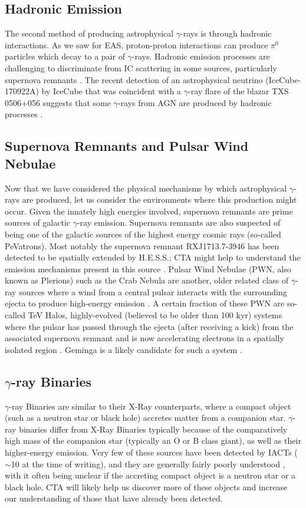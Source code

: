 \subsection{Hadronic Emission}
The second method of producing astrophysical $\gamma$-rays is through hadronic interactions. As we saw for EAS, proton-proton interactions can produce $\pi^0$ particles which decay to a pair of $\gamma$-rays. Hadronic emission processes are challenging to discriminate from IC scattering in some sources, particularly supernova remnants \cite{rxjcta}. The recent detection of an astrophysical neutrino (IceCube-170922A) by IceCube that was coincident with a $\gamma$-ray flare of the blazar TXS 0506+056 suggests that some $\gamma$-rays from AGN are produced by hadronic processes \cite{TXS}. 

\subsection{Supernova Remnants and Pulsar Wind Nebulae}
Now that we have considered the physical mechanisms by which astrophysical $\gamma$-rays are produced, let us consider the environments where this production might occur. Given the innately high energies involved, supernova remnants are prime sources of galactic $\gamma$-ray emission. Supernova remnants are also suspected of being one of the galactic sources of the highest energy cosmic rays (so-called PeVatrons). Most notably the supernova remnant RXJ1713.7-3946 has been detected to be spatially extended by H.E.S.S.; CTA might help to understand the emission mechanisms present in this source \cite{rxjcta}. Pulsar Wind Nebulae (PWN, also known as Plerions) such as the Crab Nebula are another, older related class of $\gamma$-ray sources where a wind from a central pulsar interacts with the surrounding ejecta to produce high-energy emission \cite{magiccrab}. A certain fraction of these PWN are so-called TeV Halos, highly-evolved (believed to be older than 100 kyr) systems where the pulsar has passed through the ejecta (after receiving a kick) from the associated supernova remnant and is now accelerating electrons in a spatially isolated region \cite{tevhalo}. Geminga is a likely candidate for such a system \cite{geminga}.

\subsection{$\gamma$-ray Binaries}
$\gamma$-ray Binaries are similar to their X-Ray counterparts, where a compact object (such as a neutron star or black hole) accretes matter from a companion star. $\gamma$-ray binaries differ from X-Ray Binaries typically because of the comparatively high mass of the companion star (typically an O or B class giant), as well as their higher-energy emission. Very few of these sources have been detected by IACTs ($\sim$10 at the time of writing), and they are generally fairly poorly understood \cite{scienceCTA}, with it often being unclear if the accreting compact object is a neutron star or a black hole. CTA will likely help us discover more of these objects and increase our understanding of those that have already been detected.

